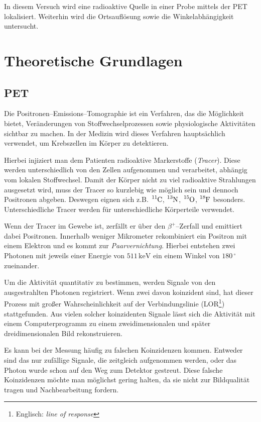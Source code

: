 \documentclass[12pt,a4paper]{scrartcl}
\numberwithin{equation}{section} %
\newcommand{\pu}[1]{\ensuremath{\mathrm{#1}}}
\begin{document}
In diesem Versuch wird eine radioaktive Quelle in einer Probe mittels der PET lokalisiert. Weiterhin wird die Ortsauflösung sowie die Winkelabhängigkeit untersucht.

\clearpage
\hypertarget{theoretische-grundlagen}{%
\section{Theoretische Grundlagen}\label{theoretische-grundlagen}}

\hypertarget{pet}{%
\subsection{PET}\label{pet}}

Die Positronen--Emissions--Tomographie ist ein Verfahren, das die Möglichkeit bietet, Veränderungen von Stoffwechselprozessen sowie physiologische Aktivitäten sichtbar zu machen. In der Medizin wird dieses Verfahren hauptsächlich verwendet, um Krebszellen im Körper zu detektieren.

Hierbei injiziert man dem Patienten radioaktive Markerstoffe (\emph{Tracer}). Diese werden unterschiedlich von den Zellen aufgenommen und verarbeitet, abhängig vom lokalen Stoffwechsel. Damit der Körper nicht zu viel radioaktive Strahlungen ausgesetzt wird, muss der Tracer so kurzlebig wie möglich sein und dennoch Positronen abgeben. Deswegen eignen sich z.B. $\ce{^{11}C}$, $\ce{^{13}N}$, $\ce{^{15}O}$,
$\ce{^{18}F}$ besonders. Unterschiedliche Tracer werden für unterschiedliche Körperteile verwendet.

Wenn der Tracer im Gewebe ist, zerfällt er über den $\beta^+$--Zerfall und emittiert dabei Positronen. Innerhalb weniger Mikrometer rekombiniert ein Positron mit einem Elektron und es kommt zur \emph{Paarvernichtung}. Hierbei entstehen zwei Photonen mit jeweils einer Energie von $\pu{511 \,keV}$ ein einem Winkel von $180\,^\circ$ zueinander. \cite{Bethge,DGNM,Annihilation}

Um die Aktivität quantitativ zu bestimmen, werden Signale von den ausgestrahlten Photonen registriert. Wenn zwei davon koinzident sind, hat dieser Prozess mit großer Wahrscheinlichkeit auf der Verbindungslinie (LOR\footnote{Englisch: \emph{line of response}}) stattgefunden. Aus vielen solcher koinzidenten Signale lässt sich die Aktivität mit einem Computerprogramm zu einem zweidimensionalen und später dreidimensionalen Bild rekonstruieren.

Es kann bei der Messung häufig zu falschen Koinzidenzen kommen. Entweder sind das nur zufällige Signale, die zeitgleich aufgenommen werden, oder das Photon wurde schon auf den Weg zum Detektor gestreut. Diese falsche Koinzidenzen möchte man möglichst gering halten, da sie nicht zur Bildqualität tragen und Nachbearbeitung fordern.
\end{document}

